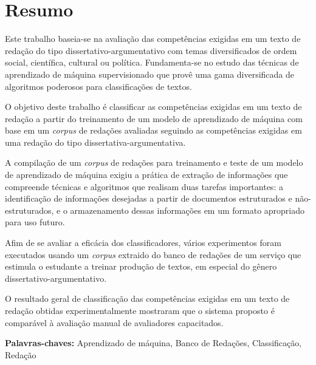 \chapter*{Resumo}

\noindent Este trabalho baseia-se na avaliação das competências exigidas em um texto de redação do tipo dissertativo-argumentativo com temas diversificados de ordem social, científica, cultural ou política. Fundamenta-se no estudo das técnicas de aprendizado de máquina supervisionado que provê uma gama diversificada de algoritmos poderosos para classificações de textos.

O objetivo deste trabalho é classificar as competências exigidas em um texto de redação a partir do treinamento de um modelo de aprendizado de máquina com base em um \textit{corpus} de redações avaliadas seguindo as competências exigidas em uma redação do tipo dissertativa-argumentativa.

A compilação de um \textit{corpus} de redações para treinamento e teste de um modelo de aprendizado de máquina exigiu a prática de extração de informações que compreende técnicas e algoritmos que realisam duas tarefas importantes: a identificação de informações desejadas a partir de documentos estruturados e não-estruturados, e o armazenamento dessas informações em um formato apropriado para uso futuro.

Afim de se avaliar a eficácia dos classificadores, vários experimentos foram executados usando um \textit{corpus} extraido do banco de redações de um serviço que estimula o estudante a treinar produção de textos, em especial do gênero dissertativo-argumentativo. 

O resultado geral de classificação das competências exigidas em um texto de redação obtidas experimentalmente mostraram que o sistema proposto é comparável à avaliação manual de avaliadores capacitados.

\textbf{Palavras-chaves:} Aprendizado de máquina, Banco de Redações, Classificação, Redação